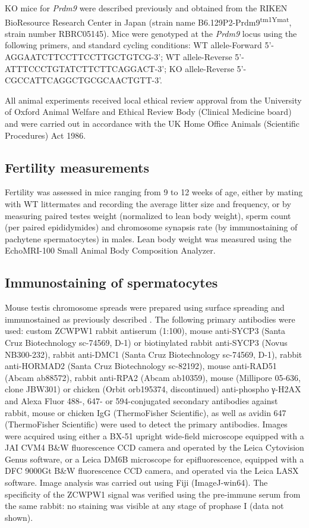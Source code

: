 KO mice for \textit{Prdm9} were described previously \parencite{Hayashi2005histone} and obtained from the RIKEN BioResource Research Center in Japan (strain name B6.129P2-Prdm9\textsuperscript{tm1Ymat}, strain number RBRC05145). Mice were genotyped at the \textit{Prdm9} locus using the following primers, and standard cycling conditions: WT allele-Forward 5’-AGGAATCTTCCTTCCTTGCTGTCG-3’; WT allele-Reverse 5’-ATTTCCCTGTATCTTCTTCAGGACT-3’; KO allele-Reverse 5’-CGCCATTCAGGCTGCGCAACTGTT-3’.

All animal experiments received local ethical review approval from the University of Oxford Animal Welfare and Ethical Review Body (Clinical Medicine board) and were carried out in accordance with the UK Home Office Animals (Scientific Procedures) Act 1986.

\subsection{Fertility measurements}
\label{sec:fertility}
Fertility was assessed in mice ranging from 9 to 12 weeks of age, either by mating with WT littermates and recording the average litter size and frequency, or by measuring paired testes weight (normalized to lean body weight), sperm count (per paired epididymides) and chromosome synapsis rate (by immunostaining of pachytene spermatocytes) in males. Lean body weight was measured using the EchoMRI-100 Small Animal Body Composition Analyzer.

\subsection{Immunostaining of spermatocytes}
\label{sec:immunostaining}
Mouse testis chromosome spreads were prepared using surface spreading \parencite{Barchi2008ATM, Peters1997dryingdown} and immunostained as previously described \parencite{Davies2016Reengineering}. The following primary antibodies were used: custom ZCWPW1 rabbit antiserum (1:100), mouse anti-SYCP3 (Santa Cruz Biotechnology sc-74569, D-1) or biotinylated rabbit anti-SYCP3 (Novus NB300-232), rabbit anti-DMC1 (Santa Cruz Biotechnology sc-74569, D-1), rabbit anti-HORMAD2 (Santa Cruz Biotechnology sc-82192), mouse anti-RAD51 (Abcam ab88572), rabbit anti-RPA2 (Abcam ab10359), mouse (Millipore 05-636, clone JBW301) or chicken (Orbit orb195374, discontinued) anti-phospho γ-H2AX and Alexa Fluor 488-, 647- or 594-conjugated secondary antibodies against rabbit, mouse or chicken IgG (ThermoFisher Scientific), as well as avidin 647 (ThermoFisher Scientific) were used to detect the primary antibodies. Images were acquired using either a BX-51 upright wide-field microscope equipped with a JAI CVM4 B\&W fluorescence CCD camera and operated by the Leica Cytovision Genus software, or a Leica DM6B microscope for epifluorescence, equipped with a DFC 9000Gt B\&W fluorescence CCD camera, and operated via the Leica LASX software. Image analysis was carried out using Fiji (ImageJ-win64). The specificity of the ZCWPW1 signal was verified using the pre-immune serum from the same rabbit: no staining was visible at any stage of prophase I (data not shown).


